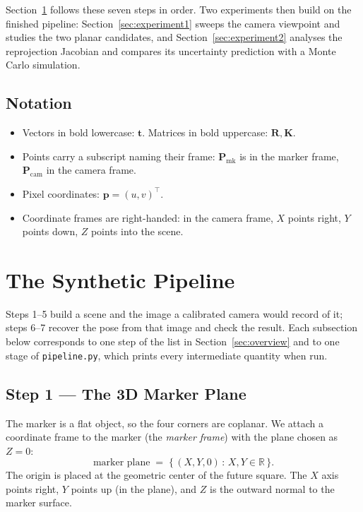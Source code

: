 \documentclass[11pt,a4paper]{article}
\theoremstyle{definition}
\theoremstyle{plain}
\theoremstyle{remark}
\newcommand{\code}[1]{\texttt{#1}}
\newcommand{\R}{\mathbb{R}}
\newcommand{\Pcam}{\mathbf{P}_{\text{cam}}}
\newcommand{\Pmark}{\mathbf{P}_{\text{mk}}}
\newcommand{\KK}{\mathbf{K}}
\begin{document}
Section~\ref{sec:pipeline} follows these seven steps in order. Two experiments
then build on the finished pipeline: Section~\ref{sec:experiment1} sweeps the
camera viewpoint and studies the two planar candidates, and
Section~\ref{sec:experiment2} analyses the reprojection Jacobian and compares
its uncertainty prediction with a Monte Carlo simulation.

\subsection{Notation}
\begin{itemize}[leftmargin=*]
  \item Vectors in bold lowercase: $\mathbf{t}$. Matrices in bold uppercase: $\mathbf{R}, \KK$.
  \item Points carry a subscript naming their frame:
        $\Pmark$ is in the marker frame, $\Pcam$ in the camera frame.
  \item Pixel coordinates: $\mathbf{p} = (u, v)^\top$.
  \item Coordinate frames are right-handed: in the camera frame, $X$ points right,
        $Y$ points down, $Z$ points into the scene.
\end{itemize}

\section{The Synthetic Pipeline}
\label{sec:pipeline}

Steps 1--5 build a scene and the image a calibrated camera would record of it;
steps 6--7 recover the pose from that image and check the result. Each
subsection below corresponds to one step of the list in
Section~\ref{sec:overview} and to one stage of \code{pipeline.py}, which prints
every intermediate quantity when run.

\subsection{Step 1 --- The 3D Marker Plane}

The marker is a flat object, so the four corners are coplanar. We attach a
coordinate frame to the marker (the \emph{marker frame}) with the plane
chosen as $Z = 0$:
\begin{equation}
  \text{marker plane} \;=\; \{\, (X, Y, 0) \,:\, X, Y \in \R \,\}.
\end{equation}
The origin is placed at the geometric center of the future square. The
$X$ axis points right, $Y$ points up (in the plane), and $Z$ is the outward
normal to the marker surface.
\end{document}
